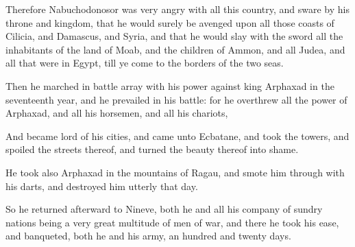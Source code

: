 {\par }{\PP {}Therefore Nabuchodonosor was very angry with all this country, and sware by his throne and kingdom, that he would surely be avenged upon all those coasts of Cilicia, and Damascus, and Syria, and that he would slay with the sword all the inhabitants of the land of Moab, and the children of Ammon, and all Judea, and all that were in Egypt, till ye come to the borders of the two seas.
\par }{\PP {}Then he marched in battle array with his power against king Arphaxad in the seventeenth year, and he prevailed in his battle: for he overthrew all the power of Arphaxad, and all his horsemen, and all his chariots,
\par }{\PP {}And became lord of his cities, and came unto Ecbatane, and took the towers, and spoiled the streets thereof, and turned the beauty thereof into shame.
\par }{\PP {}He took also Arphaxad in the mountains of Ragau, and smote him through with his darts, and destroyed him utterly that day.
\par }{\PP {}So he returned afterward to Nineve, both he and all his company of sundry nations being a very great multitude of men of war, and there he took his ease, and banqueted, both he and his army, an hundred and twenty days.

}
